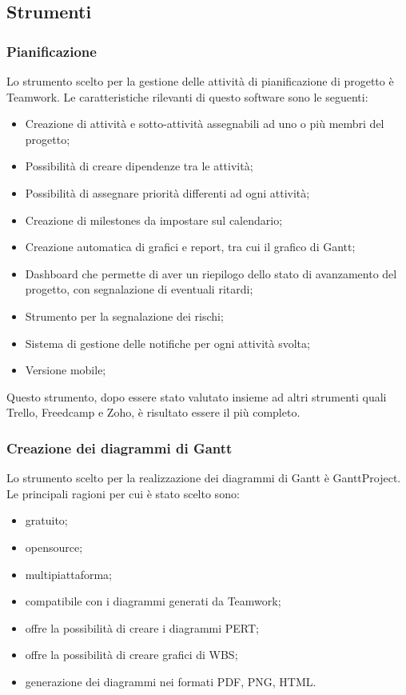\documentclass[../NormeProgetto.tex]{subfiles}
\begin{document}
	\subsection{Strumenti}
			
			\subsubsection{Pianificazione} \label{sec: Pianificazione Teamwork}
			Lo strumento scelto per la gestione delle attività di pianificazione di progetto è Teamwork. Le caratteristiche rilevanti di questo software sono le seguenti:
			\begin{itemize}
			\item Creazione di attività e sotto-attività assegnabili ad uno o più membri del progetto;
			\item Possibilità di creare dipendenze tra le attività;
			\item Possibilità di assegnare priorità differenti ad ogni attività;
			\item Creazione di milestones da impostare sul calendario;
			\item Creazione automatica di grafici e report, tra cui il grafico di Gantt;
			\item Dashboard che permette di aver un riepilogo dello stato di avanzamento del progetto, con segnalazione di eventuali ritardi;
			\item Strumento per la segnalazione dei rischi;
			\item Sistema di gestione delle notifiche per ogni attività svolta;
			\item Versione mobile;
			\end{itemize}		 
	Questo strumento, dopo essere stato valutato insieme ad altri strumenti quali Trello, Freedcamp e Zoho, è risultato essere il più completo.
			
			\subsubsection{Creazione dei diagrammi di Gantt}
			Lo strumento scelto per la realizzazione dei diagrammi di Gantt è GanttProject. Le principali ragioni per cui è stato scelto sono:
			\begin{itemize}
				\item gratuito;
				\item opensource;
				\item multipiattaforma;
				\item compatibile con i diagrammi generati da Teamwork;
				\item offre la possibilità di creare i diagrammi PERT;
				\item offre la possibilità di creare grafici di WBS;
				\item generazione dei diagrammi nei formati PDF, PNG, HTML.
			\end{itemize}
\end{document}
